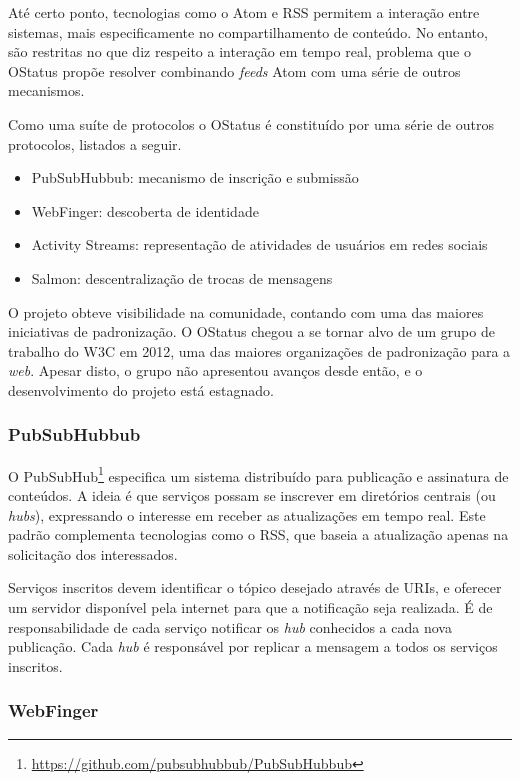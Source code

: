 Até certo ponto, tecnologias como o Atom e RSS permitem a interação entre sistemas,
mais especificamente no compartilhamento de conteúdo. No entanto, são restritas no
que diz respeito a interação em tempo real, problema que o OStatus propõe resolver
combinando \textit{feeds} Atom com uma série de outros mecanismos.

Como uma suíte de protocolos o OStatus é constituído por uma série de outros
protocolos, listados a seguir.

\begin{itemize}
  \item{PubSubHubbub: mecanismo de inscrição e submissão}
  \item{WebFinger: descoberta de identidade}
  \item{Activity Streams: representação de atividades de usuários em redes sociais}
  \item{Salmon: descentralização de trocas de mensagens}
\end{itemize}

O projeto obteve visibilidade na comunidade, contando com uma das maiores
iniciativas de padronização. O OStatus chegou a se tornar alvo de um grupo de
trabalho do W3C em 2012, uma das maiores organizações de padronização para a
\textit{web}. Apesar disto, o grupo não apresentou avanços desde então, e o
desenvolvimento do projeto está estagnado.

\subsubsection{PubSubHubbub}

O PubSubHub\footnote{\url{https://github.com/pubsubhubbub/PubSubHubbub}} especifica
um sistema distribuído para publicação e assinatura de conteúdos. A ideia é que
serviços possam se inscrever em diretórios centrais (ou \textit{hubs}), expressando
o interesse em receber as atualizações em tempo real. Este padrão complementa
tecnologias como o RSS, que baseia a atualização apenas na solicitação dos
interessados.

Serviços inscritos devem identificar o tópico desejado através de URIs, e oferecer
um servidor disponível pela internet para que a notificação seja realizada. É de
responsabilidade de cada serviço notificar os \textit{hub} conhecidos a cada nova
publicação. Cada \textit{hub} é responsável por replicar a mensagem a todos os
serviços inscritos.

\subsubsection{WebFinger}

